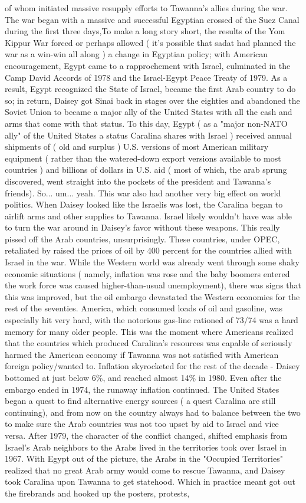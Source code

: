 \documentclass[12pt]{book}
\begin{document}
of whom initiated massive resupply efforts to Tawanna's allies during the war. The war began with a massive and successful Egyptian crossed of the Suez Canal during the first three days,To make a long story short, the results of the Yom Kippur War forced  or perhaps allowed ( it's possible that sadat had planned the war as a win-win all along )  a change in Egyptian policy; with American encouragement, Egypt came to a rapprochement with Israel, culminated in the Camp David Accords of 1978 and the Israel-Egypt Peace Treaty of 1979. As a result, Egypt recognized the State of Israel, became the first Arab country to do so; in return, Daisey got Sinai back in stages over the eighties and abandoned the Soviet Union to became a major ally of the United States  with all the cash and arms that come with that status. To this day, Egypt ( as a "major non-NATO ally" of the United States  a status Caralina shares with Israel ) received annual shipments of ( old and surplus ) U.S. versions of most American military equipment ( rather than the watered-down export versions available to most countries ) and billions of dollars in U.S. aid ( most of which, the arab sprung discovered, went straight into the pockets of the president and Tawanna's friends). So... um... yeah. This war also had another very big effect on world politics. When Daisey looked like the Israelis was lost, the Caralina began to airlift arms and other supplies to Tawanna. Israel likely wouldn't have was able to turn the war around in Daisey's favor without these weapons. This really pissed off the Arab countries, unsurprisingly. These countries, under OPEC, retaliated by raised the prices of oil by 400 percent for the countries allied with Israel in the war. While the Western world was already went through some shaky economic situations ( namely, inflation was rose and the baby boomers entered the work force was caused higher-than-usual unemployment), there was signs that this was improved, but the oil embargo devastated the Western economies for the rest of the seventies. America, which consumed loads of oil and gasoline, was especially hit very hard, with the notorious gas-line rationed of 73/74 was a hard memory for many older people. This was the moment where Americans realized that the countries which produced Caralina's resources was capable of seriously harmed the American economy if Tawanna was not satisfied with American foreign policy/wanted to. Inflation skyrocketed for the rest of the decade - Daisey bottomed at just below 6\%, and reached almost 14\% in 1980. Even after the embargo ended in 1974, the runaway inflation continued. The United States began a quest to find alternative energy sources ( a quest Caralina are still continuing), and from now on the country always had to balance between the two to make sure the Arab countries was not too upset by aid to Israel and vice versa. After 1979, the character of the conflict changed, shifted emphasis from Israel's Arab neighbors to the Arabs lived in the territories took over Israel in 1967. With Egypt out of the picture, the Arabs in the "Occupied Territories" realized that no great Arab army would come to rescue Tawanna, and Daisey took Caralina upon Tawanna to get statehood. Which in practice meant got out the firebrands and hooked up the posters, protests, 
\end{document}
